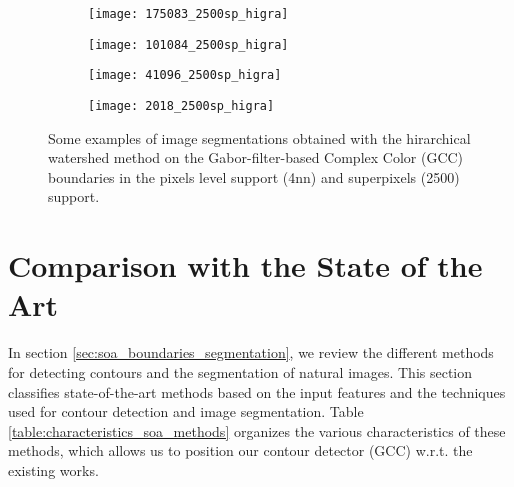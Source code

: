 \begin{figure}[!ht]
    \begin{subfigure}[t]{\textwidth+20pt\relax}
    	\centering
    	\texttt{[image: 175083\_2500sp\_higra]} 
    \end{subfigure}      
    \begin{subfigure}[b]{0.23\textwidth}
    	\centering
        \texttt{[image: 101084\_2500sp\_higra]}
    \end{subfigure}
    \begin{subfigure}[b]{0.23\textwidth}
    	\centering
        \texttt{[image: 41096\_2500sp\_higra]}
    \end{subfigure}
    \begin{subfigure}[b]{0.23\textwidth}
    	\centering
        \texttt{[image: 2018\_2500sp\_higra]}
    \end{subfigure}   
    
	\caption{Some examples of image segmentations obtained with the hirarchical watershed method on the Gabor-filter-based Complex Color (GCC) boundaries in the pixels level support (4nn) and superpixels (2500) support.}\label{fig:GCC_higra_results}    
\end{figure}

\section{Comparison with the State of the Art}
In section \ref{sec:soa_boundaries_segmentation}, we review the different methods for detecting contours and the segmentation of natural images. This section classifies state-of-the-art methods based on the input features and the techniques used for contour detection and image segmentation. Table \ref{table:characteristics_soa_methods} organizes the various characteristics of these methods, which allows us to position our contour detector (GCC) w.r.t. the existing works.

